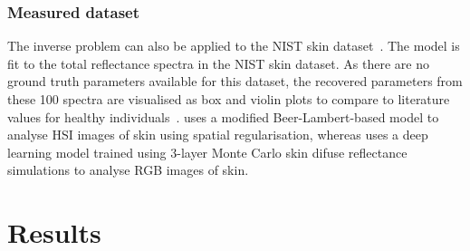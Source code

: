 \subsubsection{Measured dataset}
The inverse problem can also be applied to the NIST skin dataset~\citep{Cooksey2017}. The model is fit to the total reflectance spectra in the NIST skin dataset. As there are no ground truth parameters available for this dataset, the recovered parameters from these 100 spectra are visualised as box and violin plots to compare to literature values for healthy individuals~\citep{Jacques2013, VanManen2021, Nishidate2011, Lintzeri2022}. \citet{VanManen2021} uses a modified Beer-Lambert-based model to analyse HSI images of skin using spatial regularisation, whereas \citet{Nishidate2011} uses a deep learning model trained using 3-layer Monte Carlo skin difuse reflectance simulations to analyse RGB images of skin. 

\section{Results}\label{sec:results2}


